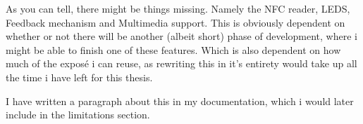 As you can tell, there might be things missing. Namely the NFC reader, LEDS, Feedback mechanism and Multimedia support.
This is obviously dependent on whether or not there will be another (albeit short) phase of development, where i might be able to finish one of these features. Which is also dependent on how much of the exposé i can reuse, as rewriting this in it's entirety would take up all the time i have left for this thesis.

I have written a paragraph about this in my documentation, which i would later include in the limitations section.